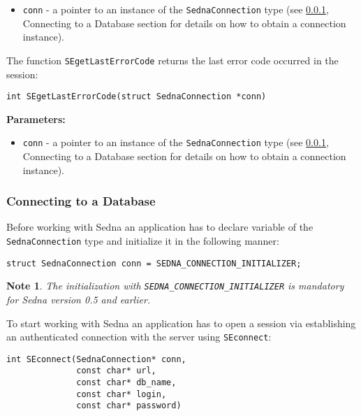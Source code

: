 \documentclass[a4paper,12pt]{article}
\newtheorem{note}{Note}    %
\newenvironment{citemize}
{\begin{itemize}
  \setlength{\itemsep}{0pt}
  \setlength{\parskip}{0pt}
  \setlength{\parsep}{0pt}}
{\end{itemize}}
\begin{document}
\begin{citemize}
\item\verb!conn! - a pointer to an instance of the \verb!SednaConnection! type 
(see \ref{c-api-connecting}, Connecting to a Database section for details on
how to obtain a connection instance).
\end{citemize}

The function \verb!SEgetLastErrorCode! returns the last error code occurred in
the session:

\begin{verbatim}
int SEgetLastErrorCode(struct SednaConnection *conn)
\end{verbatim}

\noindent
\textbf{Parameters:}

\begin{citemize}
\item\verb!conn! - a pointer to an instance of the \verb!SednaConnection! type 
(see \ref{c-api-connecting}, Connecting to a Database section for details on
how to obtain a connection instance).
\end{citemize}


\subsubsection{Connecting to a Database}
\label{c-api-connecting}

Before working with Sedna an application has to declare variable of the
\verb!SednaConnection! type and initialize it in the following manner:

\begin{verbatim}
struct SednaConnection conn = SEDNA_CONNECTION_INITIALIZER;
\end{verbatim}

\begin{note}
The initialization with \verb!SEDNA_CONNECTION_INITIALIZER! is mandatory for
Sedna version 0.5 and earlier.
\end{note}

To start working with Sedna an application has to open a session via
establishing an authenticated connection with the server using \verb!SEconnect!:

\begin{verbatim}
int SEconnect(SednaConnection* conn,
              const char* url,
              const char* db_name,
              const char* login,
              const char* password)
\end{verbatim}
\end{document}

